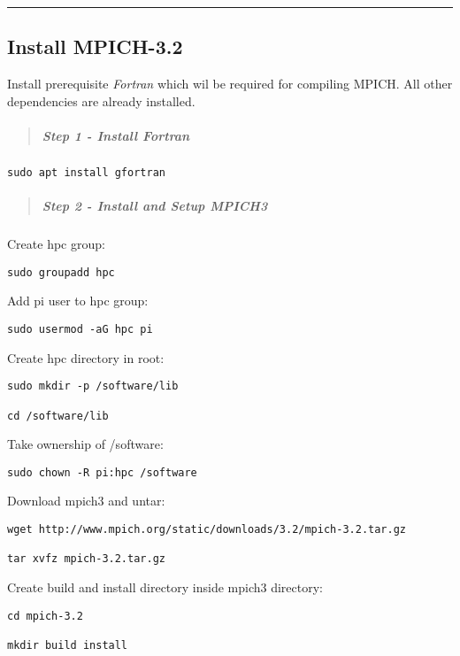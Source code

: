 \documentclass[]{article}
\let\oldsubparagraph\subparagraph
\renewcommand{\subparagraph}[1]{\oldsubparagraph{#1}\mbox{}}
\begin{document}
\begin{center}\rule{0.5\linewidth}{\linethickness}\end{center}

\subsection{Install MPICH-3.2}\label{install-mpich-3.2}

Install prerequisite \emph{Fortran} which wil be required for compiling
MPICH. All other dependencies are already installed.

\begin{quote}
\mbox{}%
\subparagraph{Step 1 - Install Fortran}\label{step-1---install-fortran}
\end{quote}

\begin{verbatim}
sudo apt install gfortran
\end{verbatim}

\begin{quote}
\mbox{}%
\subparagraph{Step 2 - Install and Setup
MPICH3}\label{step-2---install-and-setup-mpich3}
\end{quote}

Create hpc group:

\texttt{sudo\ groupadd\ hpc}

Add pi user to hpc group:

\texttt{sudo\ usermod\ -aG\ hpc\ pi}

Create hpc directory in root:

\begin{verbatim}
sudo mkdir -p /software/lib

cd /software/lib
\end{verbatim}

Take ownership of /software:

\texttt{sudo\ chown\ -R\ pi:hpc\ /software}

Download mpich3 and untar:

\begin{verbatim}
wget http://www.mpich.org/static/downloads/3.2/mpich-3.2.tar.gz

tar xvfz mpich-3.2.tar.gz
\end{verbatim}

Create build and install directory inside mpich3 directory:

\begin{verbatim}
cd mpich-3.2

mkdir build install
\end{verbatim}
\end{document}
